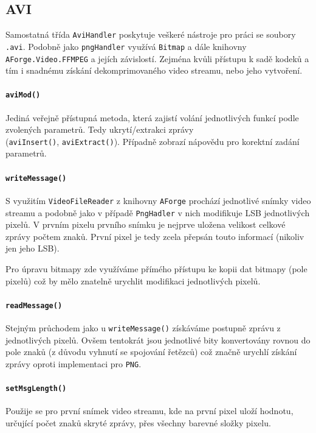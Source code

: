 \documentclass[12pt]{article}
\begin{document}
\pagebreak
\subsection{AVI}
Samostatná třída \texttt{AviHandler} poskytuje veškeré nástroje pro práci se soubory \texttt{.avi}. Podobně jako \texttt{pngHandler} využívá \texttt{Bitmap} a dále knihovny\\ \texttt{AForge.Video.FFMPEG} a jejích závislostí. Zejména kvůli přístupu k sadě kodeků a tím i snadnému získání dekomprimovaného video streamu, nebo jeho vytvoření.

\paragraph{\texttt{aviMod()}}
Jediná veřejně přístupná metoda, která zajistí volání jednotlivých funkcí podle zvolených parametrů. Tedy ukrytí/extrakci zprávy \\ (\texttt{aviInsert()}, \texttt{aviExtract()}). Případně zobrazí nápovědu pro korektní zadání parametrů.

\paragraph{\texttt{writeMessage()}}
S využitím \texttt{VideoFileReader} z knihovny \texttt{AForge} prochází jednotlivé snímky video streamu a podobně jako v případě \texttt{PngHadler} v nich modifikuje LSB jednotlivých pixelů. V prvním pixelu prvního snímku je nejprve uložena velikost celkové zprávy počtem znaků. První pixel je tedy zcela přepsán touto informací (nikoliv jen jeho LSB). 

Pro úpravu bitmapy zde využíváme přímého přístupu ke kopii dat bitmapy (pole pixelů) což by mělo znatelně urychlit modifikaci jednotlivých pixelů.

\paragraph{\texttt{readMessage()}}
Stejným průchodem jako u \texttt{writeMessage()} získáváme postupně zprávu z jednotlivých pixelů. Ovšem tentokrát jsou jednotlivé bity konvertovány rovnou do pole znaků (z důvodu vyhnutí se spojování řetězců) což značně urychlí získání zprávy oproti implementaci pro \texttt{PNG}.

\paragraph{\texttt{setMsgLength()}}
Použije se pro první snímek video streamu, kde na první pixel uloží hodnotu, určující počet znaků skryté zprávy, přes všechny barevné složky pixelu.
\end{document}
